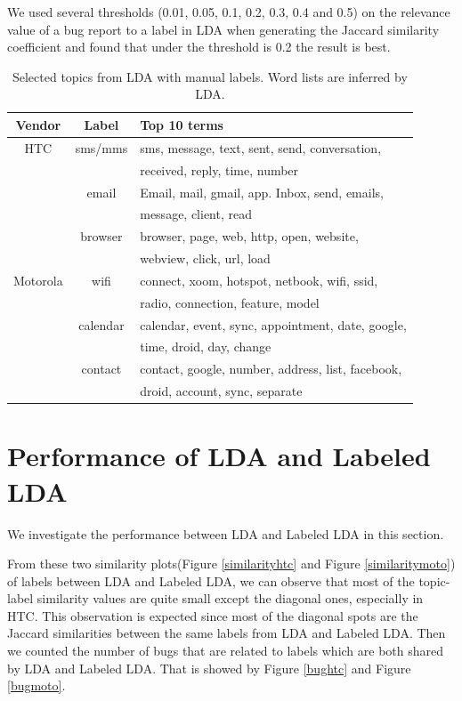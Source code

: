 \documentclass[10pt, conference, compsocconf]{IEEEtran}
\begin{document}
We used several thresholds (0.01, 0.05, 0.1, 0.2, 0.3, 0.4 and 0.5) on the relevance value of a bug report to a label in LDA when generating the Jaccard similarity coefficient and found that under the threshold is 0.2 the result is best.

\begin{table}[!t]
\renewcommand{\arraystretch}{1.3}
\caption{Selected topics from LDA with manual labels. Word lists are inferred by LDA.}
\label{seleted2}
\centering
\begin{tabular}{|c||c||l|}
\hline
Vendor & Label & Top 10 terms\\
\hline
HTC & sms\//mms &sms, message, text, sent, send, conversation, \\
            && received, reply, time, number \\ \cline{2-3}
  & email & Email, mail, gmail, app. Inbox, send, emails, \\
            &&message, client, read \\ \cline{2-3}
  & browser&browser, page, web, http, open, website, \\
            &&webview, click, url, load\\
\hline
Motorola & wifi &connect, xoom, hotspot, netbook, wifi, ssid, \\
           &&radio, connection, feature, model\\ \cline{2-3}
    &calendar& calendar, event, sync, appointment, date, google, \\
           &&time, droid, day, change \\ \cline{2-3}
    &contact & contact, google, number, address, list, facebook, \\
           &&droid, account, sync, separate \\
\hline
\end{tabular}
\end{table}


\section{Performance of LDA and Labeled LDA}
We investigate the performance between LDA and Labeled LDA in this section.

From these two similarity plots(Figure \ref{similarityhtc} and Figure \ref{similaritymoto}) of labels between LDA and Labeled LDA, we can observe that most of the topic-label similarity values are quite small except the diagonal ones, especially in HTC. This observation is expected since most of the diagonal spots are the Jaccard similarities between the same labels from LDA and Labeled LDA. Then we counted the number of bugs that are related to labels which are both shared by LDA and Labeled LDA. That is showed by Figure \ref{bughtc} and Figure \ref{bugmoto}.
\end{document}
